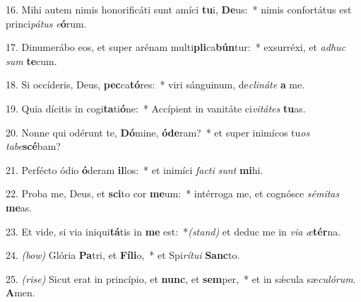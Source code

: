 	16. Mihi autem nimis honorificáti sunt amíci \textbf{tu}i, \textbf{De}us:~* nimis confortátus est princi\textit{pá}\textit{tus} \textit{e}\textbf{ó}rum.

	17. Dinumerábo eos, et super arénam multi\textbf{pli}ca\textbf{bún}tur:~* exsurréxi, et \textit{ad}\textit{huc} \textit{sum} \textbf{te}cum.

	18. Si occíderis, Deus, \textbf{pec}ca\textbf{tó}res:~* viri sánguinum, de\textit{cli}\textit{ná}\textit{te} \textbf{a} me.

	19. Quia dícitis in cogi\textbf{ta}ti\textbf{ó}ne:~* Accípient in vanitáte ci\textit{vi}\textit{tá}\textit{tes} \textbf{tu}as.

	20. Nonne qui odérunt te, \textbf{Dó}mine, \textbf{ó}\textbf{de}ram?~* et super inimícos tu\textit{os} \textit{ta}\textit{be}\textbf{scé}bam?

	21. Perfécto ódio \textbf{ó}deram \textbf{il}los:~* et inimíci \textit{fac}\textit{ti} \textit{sunt} \textbf{mi}hi.

	22. Proba me, Deus, et \textbf{sci}to cor \textbf{me}um:~* intérroga me, et cognósce \textit{sé}\textit{mi}\textit{tas} \textbf{me}as.

	23. Et vide, si via iniqui\textbf{tá}tis in \textbf{me} est:~*{\color{red}\textit{(stand)}} et deduc me in \textit{vi}\textit{a} \textit{æ}\textbf{tér}na.

	24. {\color{red}\textit{(bow)}} Glória \textbf{Pa}tri, et \textbf{Fí}\textbf{li}o,~* et Spi\textit{rí}\textit{tu}\textit{i} \textbf{Sanc}to.

	25. {\color{red}\textit{(rise)}} Sicut erat in princípio, et \textbf{nunc}, et \textbf{sem}per,~* et in s\'{\ae}cula sæ\textit{cu}\textit{ló}\textit{rum}. \textbf{A}men.